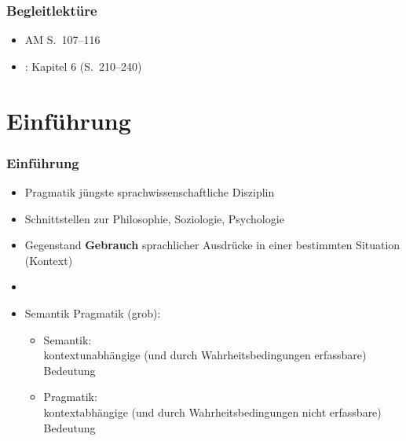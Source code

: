 \nocite{Loebner15a} %
\nocite{Loebner15b} %
\nocite{Lohnstein11} %
\nocite{Partee&Co93a} %
\nocite{ZimmermannT&Sternefeld13a} %



\begin{frame}
\frametitle{Begleitlektüre}

	\begin{itemize}
	\item AM S.~107--116
	\item \citet{Meibauer&Co07a}: Kapitel 6 (S.~210--240)
\end{itemize}

\end{frame}


%
\section{Einführung}
%

\begin{frame}
\frametitle{Einführung}

\begin{itemize}
	\item Pragmatik \ras jüngste sprachwissenschaftliche Disziplin
	\item Schnittstellen zur Philosophie, Soziologie, Psychologie
	\item Gegenstand \ras \textbf{Gebrauch} sprachlicher Ausdrücke in einer bestimmten Situation (Kontext)
	\item[]
	\item Semantik \vs Pragmatik (grob):
	
	\begin{itemize}
		\item Semantik:\\
kontextunabhängige (und durch Wahrheitsbedingungen erfassbare) Bedeutung
		\item Pragmatik: \\
kontextabhängige  (und durch Wahrheitsbedingungen nicht erfassbare) Bedeutung
	\end{itemize}
	
\end{itemize}

\end{frame}


